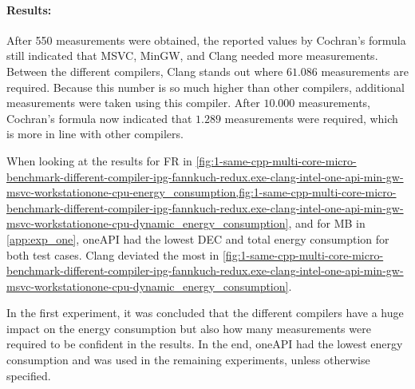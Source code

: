 


\paragraph{Results:} After 550 measurements were obtained, the reported values by Cochran's formula still indicated that MSVC, MinGW, and Clang needed more measurements. Between the different compilers, Clang stands out where $61.086$ measurements are required. Because this number is so much higher than other compilers, additional measurements were taken using this compiler. After $10.000$ measurements, Cochran's formula now indicated that $1.289$ measurements were required, which is more in line with other compilers.

When looking at the results for FR in \cref{fig:1-same-cpp-multi-core-micro-benchmark-different-compiler-ipg-fannkuch-redux.exe-clang-intel-one-api-min-gw-msvc-workstationone-cpu-energy_consumption,fig:1-same-cpp-multi-core-micro-benchmark-different-compiler-ipg-fannkuch-redux.exe-clang-intel-one-api-min-gw-msvc-workstationone-cpu-dynamic_energy_consumption}, and for MB in \cref{app:exp_one}, oneAPI had the lowest DEC and total energy consumption for both test cases. Clang deviated the most in \cref{fig:1-same-cpp-multi-core-micro-benchmark-different-compiler-ipg-fannkuch-redux.exe-clang-intel-one-api-min-gw-msvc-workstationone-cpu-dynamic_energy_consumption}.

In the first experiment, it was concluded that the different compilers have a huge impact on the energy consumption but also how many measurements were required to be confident in the results. In the end, oneAPI had the lowest energy consumption and was used in the remaining experiments, unless otherwise specified.


